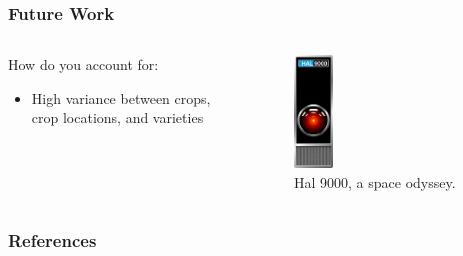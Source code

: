 \documentclass[aspectratio=169]{beamer}
\begin{document}
  \begin{frame}
    \frametitle{Future Work}
    \begin{columns}
      \begin{column}{0.5\textwidth}
        How do you account for:
        \begin{itemize}
          \item High variance between crops, crop locations, and varieties
        \end{itemize}
      \end{column}
      \begin{column}{0.5\textwidth}
        \begin{figure}[th!]
          \centering
          \includegraphics[width=0.22\textwidth]{hal9000.pdf}
          \caption{Hal 9000, a space odyssey.}
          \label{fig:hal}
        \end{figure}
      \end{column}
    \end{columns}
  \end{frame}

  \begin{frame}[allowframebreaks]
    \frametitle{References}
    \printbibliography
  \end{frame}
\end{document}

